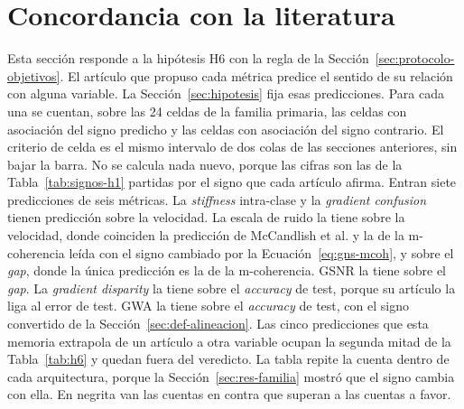\section{Concordancia con la literatura}
\label{sec:res-concordancia}

Esta sección responde a la hipótesis H6 con la regla de la Sección~\ref{sec:protocolo-objetivos}. El artículo que propuso cada métrica predice el sentido de su relación con alguna variable. La Sección~\ref{sec:hipotesis} fija esas predicciones. Para cada una se cuentan, sobre las 24 celdas de la familia primaria, las celdas con asociación del signo predicho y las celdas con asociación del signo contrario. El criterio de celda es el mismo intervalo de dos colas de las secciones anteriores, sin bajar la barra. No se calcula nada nuevo, porque las cifras son las de la Tabla~\ref{tab:signos-h1} partidas por el signo que cada artículo afirma. Entran siete predicciones de seis métricas. La \emph{stiffness} intra-clase y la \emph{gradient confusion} tienen predicción sobre la velocidad. La escala de ruido la tiene sobre la velocidad, donde coinciden la predicción de McCandlish et al. y la de la m-coherencia leída con el signo cambiado por la Ecuación~\ref{eq:gns-mcoh}, y sobre el \emph{gap}, donde la única predicción es la de la m-coherencia. GSNR la tiene sobre el \emph{gap}. La \emph{gradient disparity} la tiene sobre el \emph{accuracy} de test, porque su artículo la liga al error de test. GWA la tiene sobre el \emph{accuracy} de test, con el signo convertido de la Sección~\ref{sec:def-alineacion}. Las cinco predicciones que esta memoria extrapola de un artículo a otra variable ocupan la segunda mitad de la Tabla~\ref{tab:h6} y quedan fuera del veredicto. La tabla repite la cuenta dentro de cada arquitectura, porque la Sección~\ref{sec:res-familia} mostró que el signo cambia con ella. En negrita van las cuentas en contra que superan a las cuentas a favor.

